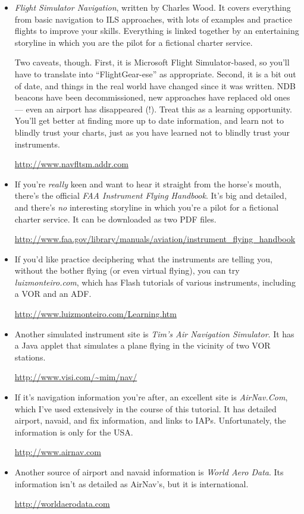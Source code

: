 \begin{itemize}
\item \textit{Flight Simulator Navigation}, written by Charles Wood.
  It covers everything from basic navigation to ILS approaches, with
  lots of examples and practice flights to improve your skills.
  Everything is linked together by an entertaining storyline in which
  you are the pilot for a fictional charter service.

  Two caveats, though.  First, it is Microsoft Flight Simulator-based,
  so you'll have to translate into ``FlightGear-ese'' as appropriate.
  Second, it is a bit out of date, and things in the real world have
  changed since it was written.  NDB beacons have been decommissioned,
  new approaches have replaced old ones --- even an airport has
  disappeared (!).  Treat this as a learning opportunity.  You'll get
  better at finding more up to date information, and learn not to
  blindly trust your charts, just as you have learned not to blindly
  trust your instruments.

  \url{http://www.navfltsm.addr.com}

\item If you're \emph{really} keen and want to hear it straight from
  the horse's mouth, there's the official \textit{FAA Instrument
    Flying Handbook}.  It's big and detailed, and there's \emph{no}
  interesting storyline in which you're a pilot for a fictional
  charter service.  It can be downloaded as two PDF files.

  \url{http://www.faa.gov/library/manuals/aviation/instrument_flying_handbook}

\item If you'd like practice deciphering what the instruments are
  telling you, without the bother flying (or even virtual flying), you
  can try \textit{luizmonteiro.com}, which has Flash tutorials of
  various instruments, including a VOR and an ADF.

  \url{http://www.luizmonteiro.com/Learning.htm}

\item Another simulated instrument site is \textit{Tim's Air
  Navigation Simulator}.  It has a Java applet that simulates a plane
  flying in the vicinity of two VOR stations.


  \url{http://www.visi.com/~mim/nav/}

\item If it's navigation information you're after, an excellent site
  is \textit{AirNav.Com}, which I've used extensively in the course of
  this tutorial.  It has detailed airport, navaid, and fix
  information, and links to IAPs.  Unfortunately, the information is
  only for the USA.

  \url{http://www.airnav.com}

\item Another source of airport and navaid information is
  \textit{World Aero Data}.  Its information isn't as detailed as
  AirNav's, but it is international.

  \url{http://worldaerodata.com}
\end{itemize}
